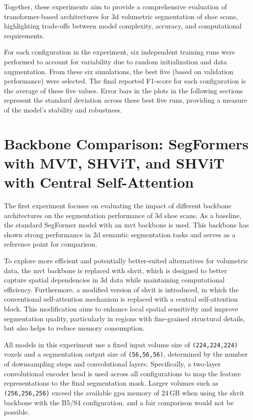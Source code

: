 Together, these experiments aim to provide a comprehensive evaluation of transformer-based architectures for \gls{3d} volumetric segmentation of shoe scans, highlighting trade-offs between model complexity, accuracy, and computational requirements.

\medskip

For each configuration in the experiment, six independent training runs were performed to account for variability due to random initialization and data augmentation. From these six simulations, the best five (based on validation performance) were selected. The final reported F1-score for each configuration is the average of these five values. Error bars in the plots in the following sections represent the standard deviation across these best five runs, providing a measure of the model's stability and robustness.



\section[Backbone Comparison: MVT, SHViT, and SHViT with CSA]{Backbone Comparison: SegFormers with MVT, SHViT, and SHViT with Central Self-Attention}
The first experiment focuses on evaluating the impact of different backbone architectures on the segmentation performance of \gls{3d} shoe scans. As a baseline, the standard SegFormer model with an \gls{mvt} backbone is used. This backbone has shown strong performance in \gls{2d} semantic segmentation tasks \cite{xie2021segformersimpleefficientdesign} and serves as a reference point for comparison.

\medskip

To explore more efficient and potentially better-suited alternatives for volumetric data, the \gls{mvt} backbone is replaced with \gls{shvit}, which is designed to better capture spatial dependencies in \gls{3d} data while maintaining computational efficiency. Furthermore, a modified version of \gls{shvit} is introduced, in which the conventional self-attention mechanism is replaced with a central self-attention block. This modification aims to enhance local spatial sensitivity and improve segmentation quality, particularly in regions with fine-grained structural details, but also helps to reduce memory consumption.

\medskip

All models in this experiment use a fixed input volume size of {\tt (224,224,224)} voxels and a segmentation output size of {\tt (56,56,56)}, determined by the number of downsampling steps and convolutional layers. Specifically, a two-layer convolutional encoder head is used across all configurations to map the feature representations to the final segmentation mask. Larger volumes such as {\tt (256,256,256)} exceed the available \acrshort{gpu} memory of 24\,GB when using the \gls{shvit} backbone with the B5/S4 configuration, and a fair comparison would not be possible.

